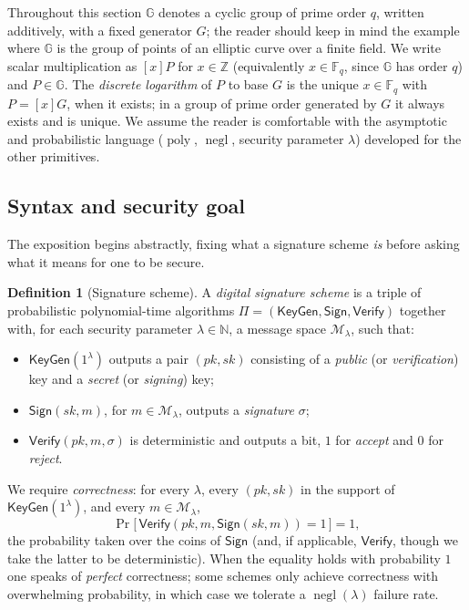 \documentclass[11pt,a4paper]{article}
\theoremstyle{definition}
\newtheorem{definition}[theorem]{Definition}
\theoremstyle{remark}
\newcommand{\N}{\ensuremath{\mathbb{N}}}
\newcommand{\Z}{\ensuremath{\mathbb{Z}}}
\newcommand{\G}{\ensuremath{\mathbb{G}}}
\newcommand{\Fq}{\ensuremath{\mathbb{F}_{q}}}
\DeclareMathOperator{\negl}{negl}
\DeclareMathOperator{\poly}{poly}
\begin{document}
Throughout this section \(\G\) denotes a cyclic group of prime order \(q\), written additively, with a fixed generator \(G\); the reader should keep in mind the example where \(\G\) is the group of points of an elliptic curve over a finite field. We write scalar multiplication as \([x]P\) for \(x \in \Z\) (equivalently \(x \in \Fq\), since \(\G\) has order \(q\)) and \(P \in \G\). The \emph{discrete logarithm} of \(P\) to base \(G\) is the unique \(x \in \Fq\) with \(P = [x]G\), when it exists; in a group of prime order generated by \(G\) it always exists and is unique. We assume the reader is comfortable with the asymptotic and probabilistic language (\(\poly\), \(\negl\), security parameter \(\lambda\)) developed for the other primitives.

\subsection{Syntax and security goal}\label{signatures:subsec:syntax}

The exposition begins abstractly, fixing what a signature scheme \emph{is} before asking what it means for one to be secure.

\begin{definition}[Signature scheme]\label{signatures:def:scheme}
A \emph{digital signature scheme} is a triple of probabilistic polynomial-time algorithms \(\Pi = (\mathsf{KeyGen}, \mathsf{Sign}, \mathsf{Verify})\) together with, for each security parameter \(\lambda \in \N\), a message space \(\mathcal{M}_\lambda\), such that:
\begin{itemize}
  \item \(\mathsf{KeyGen}(1^\lambda)\) outputs a pair \((\mathit{pk}, \mathit{sk})\) consisting of a \emph{public} (or \emph{verification}) key and a \emph{secret} (or \emph{signing}) key;
  \item \(\mathsf{Sign}(\mathit{sk}, m)\), for \(m \in \mathcal{M}_\lambda\), outputs a \emph{signature} \(\sigma\);
  \item \(\mathsf{Verify}(\mathit{pk}, m, \sigma)\) is deterministic and outputs a bit, \(1\) for \emph{accept} and \(0\) for \emph{reject}.
\end{itemize}
We require \emph{correctness}: for every \(\lambda\), every \((\mathit{pk}, \mathit{sk})\) in the support of \(\mathsf{KeyGen}(1^\lambda)\), and every \(m \in \mathcal{M}_\lambda\),
\[
  \Pr\!\big[\, \mathsf{Verify}(\mathit{pk}, m, \mathsf{Sign}(\mathit{sk}, m)) = 1 \,\big] = 1,
\]
the probability taken over the coins of \(\mathsf{Sign}\) (and, if applicable, \(\mathsf{Verify}\), though we take the latter to be deterministic). When the equality holds with probability \(1\) one speaks of \emph{perfect} correctness; some schemes only achieve correctness with overwhelming probability, in which case we tolerate a \(\negl(\lambda)\) failure rate.
\end{definition}
\end{document}
